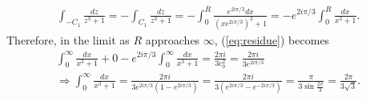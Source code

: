 \documentclass[a4paper,12pt]{article}
\begin{document}
\begin{enumerate}
\begin{gather*}
            \int_{-C_1} \frac{dz}{z^3 + 1} = -\int_{C_1} \frac{dz}{z^3 + 1} = -\int_0^R \frac{e^{2i\pi/3} dx}{(xe^{2i\pi/3})^3 + 1} = -e^{2i\pi/3} \int_0^R \frac{dx}{x^3 + 1}.
        \end{gather*}
        Therefore, in the limit as $R$ approaches $\infty$, (\ref{eq:residue}) becomes
        \begin{gather*}
            \int_0^\infty \frac{dx}{x^3 + 1} + 0 - e^{2i\pi/3} \int_0^\infty \frac{dx}{x^3 + 1} = \frac{2\pi i}{3c_0^2} = \frac{2\pi i}{3e^{2i\pi/3}} \\
            \Rightarrow \int_0^\infty \frac{dx}{x^3 + 1} = \frac{2\pi i}{3e^{2i\pi/3} (1 - e^{2i\pi/3})} = \frac{2\pi i}{3(e^{2i\pi/3} - e^{-2i\pi/3})} = \frac{\pi}{3\sin\frac{2\pi}{3}} = \frac{2\pi}{3\sqrt{3}}.
        \end{gather*}
\end{enumerate}
\end{document}
